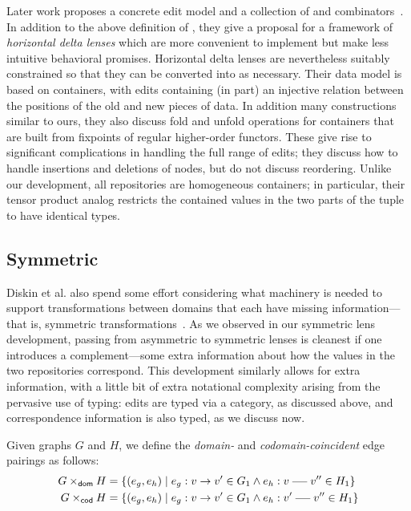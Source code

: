 Later work proposes a concrete edit model and a collection of \WBADLs and
combinators~\cite{Pacheco2012}. In addition to the above definition of
\WBADLs, they give a proposal for a framework of \emph{horizontal delta
lenses} which are more convenient to implement but make less intuitive
behavioral promises. Horizontal delta lenses are nevertheless suitably
constrained so that they can be converted into \WBADLs as necessary. Their
data model is based on containers, with edits containing (in part) an
injective relation between the positions of the old and new pieces of data.
In addition many constructions similar to ours, they also discuss fold and
unfold operations for containers that are built from fixpoints of regular
higher-order functors. These give rise to significant complications in
handling the full range of edits; they discuss how to handle insertions and
deletions of nodes, but do not discuss reordering. Unlike our development,
all repositories are homogeneous containers; in particular, their tensor
product analog restricts the contained values in the two parts of the tuple
to have identical types.

\subsection{Symmetric}
\label{sec:delta:symmetric}
Diskin et al. also spend some effort considering what machinery is needed to
support transformations between domains that each have missing
information---that is, symmetric transformations~\cite{Diskin-Delta11}. As
we observed in our symmetric lens development, passing from asymmetric to
symmetric lenses is cleanest if one introduces a complement---some extra
information about how the values in the two repositories correspond. This
development similarly allows for extra information, with a little bit of
extra notational complexity arising from the pervasive use of typing: edits
are typed via a category, as discussed above, and correspondence information
is also typed, as we discuss now.


\begin{definition}
    Given graphs $G$ and $H$, we define the \emph{domain-} and
    \emph{codomain-coincident} edge pairings as follows:
    \begin{align*}
        G \domco H &= \{(e_g,e_h) \mid e_g : v \dedge v' \in G_1 \land e_h :
        v \uedge v'' \in H_1\} \\
        G \codco H &= \{(e_g,e_h) \mid e_g : v \dedge v' \in G_1 \land e_h :
        v' \uedge v'' \in H_1\}
    \end{align*}
\end{definition}

